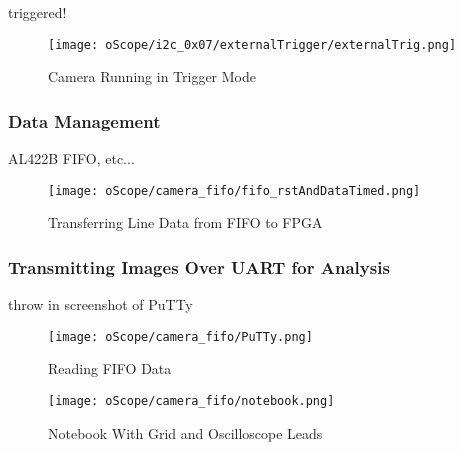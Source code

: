 \par
triggered!

\begin{figure}[H]
	\centerline{\texttt{[image: oScope/i2c\_0x07/externalTrigger/externalTrig.png]}}
	\caption{Camera Running in Trigger Mode}
	\label{camInTrigMode}
\end{figure}


\subsubsection{Data Management}
AL422B FIFO, etc...

\begin{figure}[H]
	\centerline{\texttt{[image: oScope/camera\_fifo/fifo\_rstAndDataTimed.png]}}
	\caption{Transferring Line Data from FIFO to FPGA}
	\label{fifoDataOut}
\end{figure}

\subsubsection{Transmitting Images Over UART for Analysis}
throw in screenshot of PuTTy
\begin{figure}[H]
	\centerline{\texttt{[image: oScope/camera\_fifo/PuTTy.png]}}
	\caption{Reading FIFO Data}
	\label{PuTTYfifoData}
\end{figure}
\begin{figure}[H]
	\centerline{\texttt{[image: oScope/camera\_fifo/notebook.png]}}
	\caption{Notebook With Grid and Oscilloscope Leads}
	\label{notebookImage}
\end{figure}